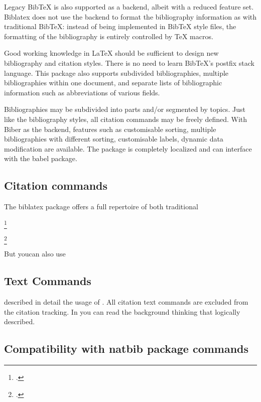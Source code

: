 \begin{refsection}
Legacy BibTeX is also supported as a backend, albeit with a
reduced feature set. Biblatex does not use the backend to format the bibliography
information as with traditional BibTeX: instead of being implemented in BibTeX
style files, the formatting of the bibliography is entirely controlled by TeX macros.

Good working knowledge in LaTeX should be sufficient to design new bibliography
and citation styles. There is no need to learn BibTeX’s postfix stack language. This
package also supports subdivided bibliographies, multiple bibliographies within
one document, and separate lists of bibliographic information such as abbreviations
of various fields. 

Bibliographies may be subdivided into parts and/or segmented
by topics. Just like the bibliography styles, all citation commands may be freely
defined. With Biber as the backend, features such as customisable sorting, multiple
bibliographies with different sorting, customisable labels, dynamic data modification
are available. The package is completely localized and can interface with the babel
package. 

\subsection{Citation commands}

The biblatex package offers a full repertoire of both traditional 

\cite{Bringhurst2005}

\parencite{Bringhurst2005}

\footcite{Bringhurst2005}

\footcitetext{Lamport1994}

But youcan also use \autocite{Lamport1994}

\subsection{Text Commands}

\citeauthor{Lamport1994} described in detail the usage of \latex. All citation text commands
are excluded from the citation tracking. In  you can read the background
thinking that logically described.


\subsection{Compatibility with natbib package commands}


\printbibliography

\end{refsection}




